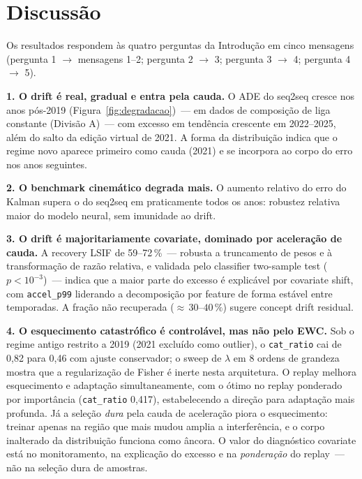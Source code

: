 \documentclass[runningheads]{llncs}
\begin{document}
\section{Discuss\~ao}

Os resultados respondem \`as quatro perguntas da Introdu\c{c}\~ao em cinco mensagens (pergunta 1 $\to$ mensagens 1--2; pergunta 2 $\to$ 3; pergunta 3 $\to$ 4; pergunta 4 $\to$ 5).

\textbf{1. O drift \'e real, gradual e entra pela cauda.} O ADE do seq2seq cresce nos anos p\'os-2019 (Figura~\ref{fig:degradacao})~--- em dados de composi\c{c}\~ao de liga constante (Divis\~ao A)~--- com excesso em tend\^encia crescente em 2022--2025, al\'em do salto da edi\c{c}\~ao virtual de 2021. A forma da distribui\c{c}\~ao indica que o regime novo aparece primeiro como cauda (2021) e se incorpora ao corpo do erro nos anos seguintes.

\textbf{2. O benchmark cinem\'atico degrada mais.} O aumento relativo do erro do Kalman supera o do seq2seq em praticamente todos os anos: robustez relativa maior do modelo neural, sem imunidade ao drift.

\textbf{3. O drift \'e majoritariamente covariate, dominado por acelera\c{c}\~ao de cauda.} A recovery LSIF de 59--72\,\%~--- robusta a truncamento de pesos e \`a transforma\c{c}\~ao de raz\~ao relativa, e validada pelo classifier two-sample test ($p<10^{-3}$)~--- indica que a maior parte do excesso \'e explic\'avel por covariate shift, com \texttt{accel\_p99} liderando a decomposi\c{c}\~ao por feature de forma est\'avel entre temporadas. A fra\c{c}\~ao n\~ao recuperada (${\approx}\,30$--$40\,\%$) sugere concept drift residual.

\textbf{4. O esquecimento catastr\'ofico \'e control\'avel, mas n\~ao pelo EWC.} Sob o regime antigo restrito a 2019 (2021 exclu\'ido como outlier), o \texttt{cat\_ratio} cai de 0{,}82 para 0{,}46 com ajuste conservador; o sweep de $\lambda$ em 8 ordens de grandeza mostra que a regulariza\c{c}\~ao de Fisher \'e inerte nesta arquitetura. O replay melhora esquecimento e adapta\c{c}\~ao simultaneamente, com o \'otimo no replay ponderado por import\^ancia (\texttt{cat\_ratio} 0{,}417), estabelecendo a dire\c{c}\~ao para adapta\c{c}\~ao mais profunda. J\'a a sele\c{c}\~ao \emph{dura} pela cauda de acelera\c{c}\~ao piora o esquecimento: treinar apenas na regi\~ao que mais mudou amplia a interfer\^encia, e o corpo inalterado da distribui\c{c}\~ao funciona como \^ancora. O valor do diagn\'ostico covariate est\'a no monitoramento, na explica\c{c}\~ao do excesso e na \emph{pondera\c{c}\~ao} do replay~--- n\~ao na sele\c{c}\~ao dura de amostras.
\end{document}
